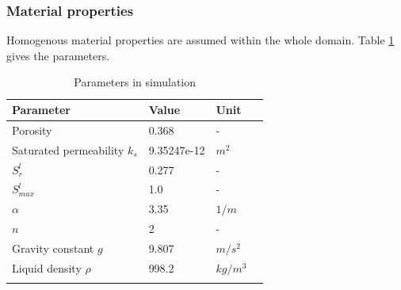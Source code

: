 \subsubsection*{Material properties}
Homogenous material properties are assumed within the whole
domain. Table \ref{us:celia-setting} gives the parameters.
\begin{table}[H]
 \centering
 \caption{Parameters in simulation} \centering \label{us:celia-setting}
 \begin{tabular}{llll}
 \hline\hline\noalign{\smallskip}
 Parameter    & Value  &  Unit  \\ \hline
 Porosity          & 0.368   & -   \\
 Saturated permeability $k_s$ & 9.35247e-12 & $m^2$  \\
 $S_r^l$           & 0.277    &  - \\
 $S_{max}^l$        & 1.0    &  - \\
 $\alpha$           & 3.35   &  $1/m$ \\
 $n$                & 2      &  - \\
 Gravity constant $g$ & 9.807      &  $m/s^2$ \\
 Liquid density $\rho$ & 998.2     &  $kg/m^3$ \\
\noalign{\smallskip}\hline\hline
 \end{tabular}
\end{table}

